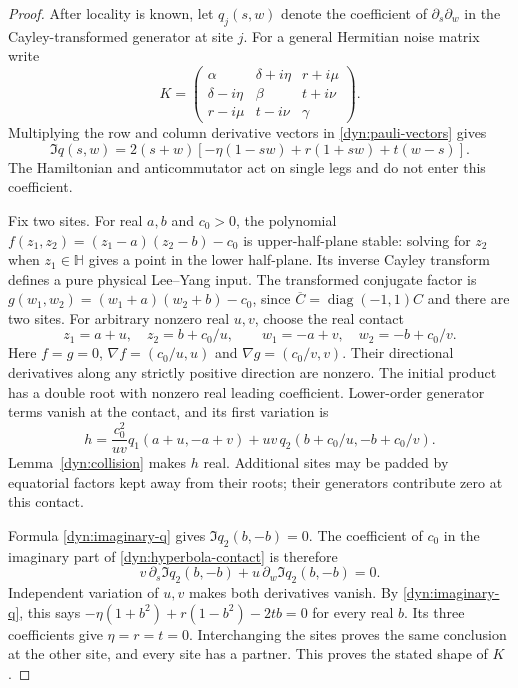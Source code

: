 \documentclass[reqno]{amsart}
\theoremstyle{definition}
\theoremstyle{remark}
\newcommand{\HH}{\mathbb H}
\DeclareMathOperator{\diag}{diag}
\begin{document}
\begin{proof}
After locality is known, let $q_j(s,w)$ denote the coefficient of
$\partial_s\partial_w$ in the Cayley-transformed generator at site $j$.
For a general Hermitian noise matrix write
\[
 K=\begin{pmatrix}
 \alpha&\delta+i\eta&r+i\mu\\
 \delta-i\eta&\beta&t+i\nu\\
 r-i\mu&t-i\nu&\gamma
 \end{pmatrix}.
\]
Multiplying the row and column derivative vectors in
\eqref{dyn:pauli-vectors} gives
\begin{equation}\label{dyn:imaginary-q}
 \Im q(s,w)=2(s+w)[-\eta(1-sw)+r(1+sw)+t(w-s)].
\end{equation}
The Hamiltonian and anticommutator act on single legs and do not enter
this coefficient.

Fix two sites.  For real $a,b$ and $c_0>0$, the polynomial
$f(z_1,z_2)=(z_1-a)(z_2-b)-c_0$ is upper-half-plane stable: solving for
$z_2$ when $z_1\in\HH$ gives a point in the lower half-plane.
Its inverse Cayley transform defines a pure physical Lee--Yang input.
The transformed conjugate factor is
$g(w_1,w_2)=(w_1+a)(w_2+b)-c_0$, since
$\overline C=\diag(-1,1)C$ and there are two sites.
For arbitrary nonzero real $u,v$, choose the real contact
\[
 z_1=a+u,\quad z_2=b+c_0/u,\qquad
 w_1=-a+v,\quad w_2=-b+c_0/v.
\]
Here $f=g=0$, $\nabla f=(c_0/u,u)$ and
$\nabla g=(c_0/v,v)$.  Their directional derivatives along any strictly
positive direction are nonzero.  The initial product has a double root
with nonzero real leading coefficient.  Lower-order generator terms
vanish at the contact, and its first variation is
\begin{equation}\label{dyn:hyperbola-contact}
 h=\frac{c_0^2}{uv}q_1(a+u,-a+v)
   +uv\,q_2(b+c_0/u,-b+c_0/v).
\end{equation}
Lemma~\ref{dyn:collision} makes $h$ real.  Additional sites may be padded
by equatorial factors kept away from their roots; their generators
contribute zero at this contact.

Formula \eqref{dyn:imaginary-q} gives $\Im q_2(b,-b)=0$.
The coefficient of $c_0$ in the imaginary part of
\eqref{dyn:hyperbola-contact} is therefore
\[
 v\,\partial_s\Im q_2(b,-b)+u\,\partial_w\Im q_2(b,-b)=0.
\]
Independent variation of $u,v$ makes both derivatives vanish.
By \eqref{dyn:imaginary-q}, this says
$-\eta(1+b^2)+r(1-b^2)-2tb=0$ for every real $b$.
Its three coefficients give $\eta=r=t=0$.  Interchanging the sites proves
the same conclusion at the other site, and every site has a partner.
This proves the stated shape of $K$.


\end{proof}
\end{document}
